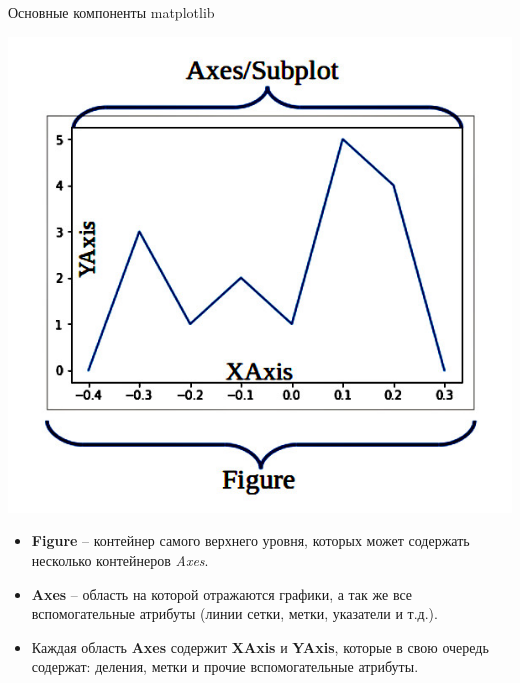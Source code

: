 \documentclass[12pt]{beamer}
\begin{document}
\begin{frame}{Основные компоненты matplotlib}

\begin{minipage}{0.35\textwidth}
  \begin{flushleft}
	\includegraphics[scale=0.2]{image/mpl_anatomy.jpg}
	\vspace{2.2cm}
  \end{flushleft}
\end{minipage}
\begin{minipage}{0.6\textwidth}
  \begin{flushright}  
	\begin{itemize}
		\item \textbf{Figure} -- контейнер самого верхнего уровня, которых может содержать несколько контейнеров \textit{Axes}. 
		\item \textbf{Axes} -- область на которой отражаются графики, а так же все вспомогательные атрибуты (линии сетки, метки, указатели и т.д.).
		\item Каждая область \textbf{Axes} содержит \textbf{XAxis} и \textbf{YAxis}, которые в свою очередь содержат: деления, метки и прочие вспомогательные атрибуты. 
\end{itemize}
  \end{flushright}
\end{minipage}

\end{frame}
\end{document}
